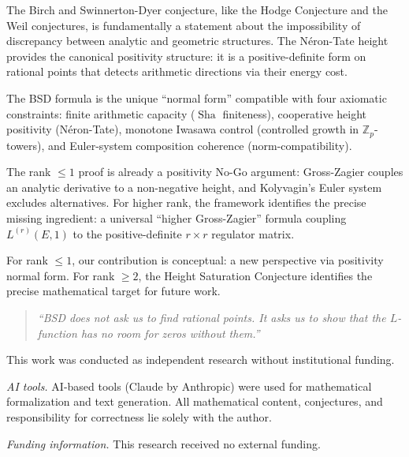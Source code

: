 \documentclass[aps,prd,twocolumn,superscriptaddress,nofootinbib]{revtex4-2}
\theoremstyle{definition}
\theoremstyle{remark}
\DeclareMathOperator{\Sha}{Sha}
\begin{document}
The Birch and Swinnerton-Dyer conjecture, like the Hodge Conjecture and the Weil conjectures, is fundamentally a statement about the impossibility of discrepancy between analytic and geometric structures. The N\'eron-Tate height provides the canonical positivity structure: it is a positive-definite form on rational points that detects arithmetic directions via their energy cost.

The BSD formula is the unique ``normal form'' compatible with four axiomatic constraints: finite arithmetic capacity ($\Sha$ finiteness), cooperative height positivity (N\'eron-Tate), monotone Iwasawa control (controlled growth in $\mathbb{Z}_p$-towers), and Euler-system composition coherence (norm-compatibility).

The rank $\leq 1$ proof is already a positivity No-Go argument: Gross-Zagier couples an analytic derivative to a non-negative height, and Kolyvagin's Euler system excludes alternatives. For higher rank, the framework identifies the precise missing ingredient: a universal ``higher Gross-Zagier'' formula coupling $L^{(r)}(E,1)$ to the positive-definite $r \times r$ regulator matrix.

For rank $\leq 1$, our contribution is conceptual: a new perspective via positivity normal form. For rank $\geq 2$, the Height Saturation Conjecture identifies the precise mathematical target for future work.

\begin{quote}
\textit{``BSD does not ask us to find rational points. It asks us to show that the $L$-function has no room for zeros without them.''}
\end{quote}


\begin{acknowledgments}
This work was conducted as independent research without institutional funding.

\textit{AI tools.} AI-based tools (Claude by Anthropic) were used for mathematical formalization and text generation. All mathematical content, conjectures, and responsibility for correctness lie solely with the author.

\textit{Funding information.} This research received no external funding.
\end{acknowledgments}
\end{document}
